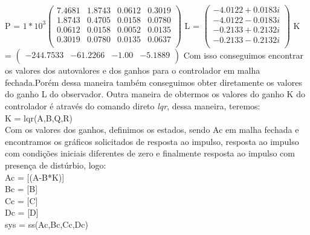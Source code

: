 \documentclass[a4paper]{article}
\begin{document}
\newline
\newline
P = \(1*10^{3}\)$\begin{pmatrix}
     7.4681 & 1.8743 & 0.0612 &  0.3019\\
     1.8743 & 0.4705 & 0.0158 & 0.0780\\
     0.0612 & 0.0158 & 0.0052 & 0.0135\\
     0.3019 & 0.0780 & 0.0135 & 0.0637\\
\end{pmatrix}$
\newline
\newline
\newline
L = $\begin{pmatrix}
     -4.0122 + 0.0183i\\
     -4.0122 - 0.0183i\\
     -0.2133 + 0.2132i\\
     -0.2133 - 0.2132i\\
\end{pmatrix}$
\newline
\newline
\newline
K = $\begin{pmatrix}
     -244.7533 & -61.2266 & -1.00 & - 5.1889\\
\end{pmatrix}$
\newline
\newline
Com isso conseguimos encontrar os valores dos autovalores e dos ganhos para o controlador em malha fechada.Porém dessa maneira também conseguimos obter diretamente os valores do ganho L do observador. Outra maneira de obtermos os valores do ganho K do controlador é através do comando direto \textit{lqr}, dessa maneira, teremos:\\
K = lqr(A,B,Q,R)\\
Com os valores dos ganhos, definimos os estados, sendo Ac em malha fechada e encontramos os gráficos solicitados de resposta ao impulso, resposta ao impulso com condições iniciais diferentes de zero e finalmente resposta ao impulso com presença de distúrbio, logo:\\
Ac = [(A-B*K)]\\
Bc = [B]\\
Cc = [C]\\
Dc = [D]\\
\newline
sys = ss(Ac,Bc,Cc,Dc)\\
\newline
\end{document}
